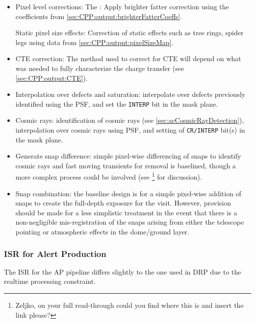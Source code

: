\begin{itemize}
\item Pixel level corrections:
	\mysubitem The \bfeffect: Apply brighter fatter correction using the coefficients from \secsymbol\ref{sec:CPP:output:brighterFatterCoeffs}. 
	
	\mysubitem Static pixel size effects: Correction of static effects such as tree rings, spider legs \etc using data from \secsymbol\ref{sec:CPP:output:pixelSizeMap}. 

\item CTE correction: The method used to correct for CTE will depend on what was needed to fully characterize the charge transfer (see \secsymbol\ref{sec:CPP:output:CTE}).

\item Interpolation over defects and saturation: interpolate over defects previously identified using the PSF, and set the \texttt{INTERP} bit in the mask plane.

\item Cosmic rays: identification of cosmic rays (see \secsymbol\ref{sec:acCosmicRayDetection}), interpolation over cosmic rays using PSF, and setting of \texttt{CR/INTERP} bit(s) in the mask plane.

\item Generate snap difference: simple pixel-wise differencing of snaps to identify cosmic rays and fast moving transients for removal is baselined, though a more complex process could be involved (see \secsymbol\xxx\footnote{Zeljko, on your full read-through could you find where this is and insert the link please?} for discussion).

\item Snap combination: the baseline design is for a simple pixel-wise addition of snaps to create the full-depth exposure for the visit. However, provision should be made for a less simplistic treatment in the event that there is a non-negligible mis-registration of the snaps arising from either the telescope pointing or atmospheric effects \eg in the dome/ground layer.

\end{itemize}

\subsubsection{ISR for Alert Production}
\label{sec:acISR_AP}
The ISR for the AP pipeline differs slightly to the one used in DRP due to the realtime processing constraint.

